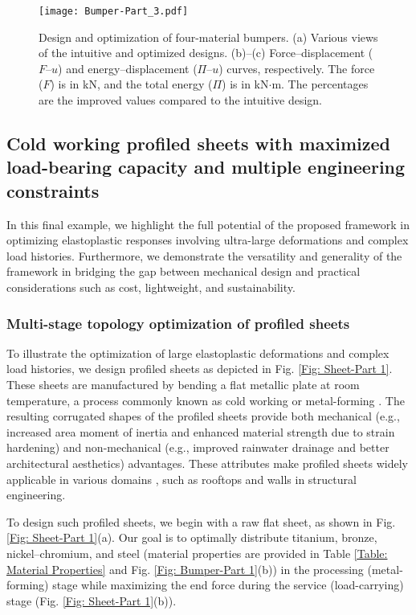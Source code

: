 \documentclass[preprint,11pt]{elsarticle}
\theoremstyle{definition}
\begin{document}
\begin{figure}[!htbp]
    \centering
    \texttt{[image: Bumper-Part\_3.pdf]}
    \caption{Design and optimization of four-material bumpers. (a) Various views of the intuitive and optimized designs. (b)--(c) Force--displacement ($F$--$u$) and energy--displacement ($\Pi$--$u$) curves, respectively. The force ($F$) is in kN, and the total energy ($\Pi$) is in kN$\cdot$m. The percentages are the improved values compared to the intuitive design.}
    \label{Fig: Bumper-Part 3}
\end{figure}

\subsection{Cold working profiled sheets with maximized load-bearing capacity and multiple engineering constraints}

In this final example, we highlight the full potential of the proposed framework in optimizing elastoplastic responses involving ultra-large deformations and complex load histories. Furthermore, we demonstrate the versatility and generality of the framework in bridging the gap between mechanical design and practical considerations such as cost, lightweight, and sustainability.

\subsubsection{Multi-stage topology optimization of profiled sheets}

To illustrate the optimization of large elastoplastic deformations and complex load histories, we design profiled sheets as depicted in Fig. \ref{Fig: Sheet-Part 1}. These sheets are manufactured by bending a flat metallic plate at room temperature, a process commonly known as cold working or metal-forming \citep{gearing_plasticity_2001, cvitanic_finite_2008}. The resulting corrugated shapes of the profiled sheets provide both mechanical (e.g., increased area moment of inertia and enhanced material strength due to strain hardening) and non-mechanical (e.g., improved rainwater drainage and better architectural aesthetics) advantages. These attributes make profiled sheets widely applicable in various domains \citep{wright_use_1987}, such as rooftops and walls in structural engineering.

To design such profiled sheets, we begin with a raw flat sheet, as shown in Fig. \ref{Fig: Sheet-Part 1}(a). Our goal is to optimally distribute titanium, bronze, nickel--chromium, and steel (material properties are provided in Table \ref{Table: Material Properties} and Fig. \ref{Fig: Bumper-Part 1}(b)) in the processing (metal-forming) stage while maximizing the end force during the service (load-carrying) stage (Fig. \ref{Fig: Sheet-Part 1}(b)).
\end{document}
